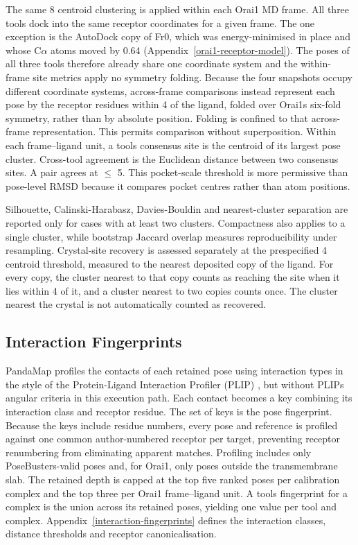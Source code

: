 The same 8\angstrom{} centroid clustering is applied within each Orai1 MD frame. All three tools dock into the same receptor coordinates for a given frame. The one exception is the AutoDock copy of Fr0, which was energy-minimised in place and whose C\ensuremath{\alpha} atoms moved by 0.64\angstrom{} (Appendix~\ref{orai1-receptor-model}). The poses of all three tools therefore already share one coordinate system and the within-frame site metrics apply no symmetry folding. Because the four snapshots occupy different coordinate systems, across-frame comparisons instead represent each pose by the receptor residues within 4\angstrom{} of the ligand, folded over Orai1\textquotesingle s six-fold symmetry, rather than by absolute position. Folding is confined to that across-frame representation. This permits comparison without superposition. Within each frame--ligand unit, a tool\textquotesingle s consensus site is the centroid of its largest pose cluster. Cross-tool agreement is the Euclidean distance between two consensus sites. A pair agrees at \ensuremath{\leq} 5\angstrom{}. This pocket-scale threshold is more permissive than pose-level RMSD because it compares pocket centres rather than atom positions.

Silhouette, Calinski-Harabasz, Davies-Bouldin and nearest-cluster separation are reported only for cases with at least two clusters. Compactness also applies to a single cluster, while bootstrap Jaccard overlap measures reproducibility under resampling. Crystal-site recovery is assessed separately at the prespecified 4\angstrom{} centroid threshold, measured to the nearest deposited copy of the ligand. For every copy, the cluster nearest to that copy counts as reaching the site when it lies within 4\angstrom{} of it, and a cluster nearest to two copies counts once. The cluster nearest the crystal is not automatically counted as recovered.

\hypertarget{interaction-fingerprints-metric}{%
\subsection{Interaction Fingerprints}\label{interaction-fingerprints-metric}}

PandaMap profiles the contacts of each retained pose \cite{ref090} using interaction types in the style of the Protein-Ligand Interaction Profiler (PLIP) \cite{ref054}, but without PLIP\textquotesingle s angular criteria in this execution path. Each contact becomes a key combining its interaction class and receptor residue. The set of keys is the pose fingerprint. Because the keys include residue numbers, every pose and reference is profiled against one common author-numbered receptor per target, preventing receptor renumbering from eliminating apparent matches. Profiling includes only PoseBusters-valid poses and, for Orai1, only poses outside the transmembrane slab. The retained depth is capped at the top five ranked poses per calibration complex and the top three per Orai1 frame--ligand unit. A tool\textquotesingle s fingerprint for a complex is the union across its retained poses, yielding one value per tool and complex. Appendix~\ref{interaction-fingerprints} defines the interaction classes, distance thresholds and receptor canonicalisation.

